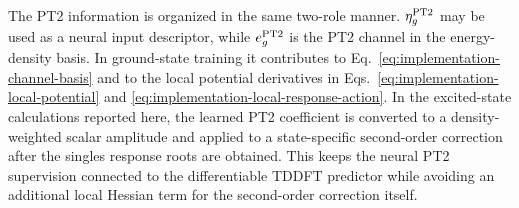 The PT2 information is organized in the same two-role manner.
$\eta^{\rm PT2}_g$ may be used as a neural input descriptor, while
$e^{\rm PT2}_g$ is the PT2 channel in the energy-density basis.  In
ground-state training it contributes to
Eq.~\eqref{eq:implementation-channel-basis} and to the local potential
derivatives in Eqs.~\eqref{eq:implementation-local-potential} and
\eqref{eq:implementation-local-response-action}.  In the excited-state
calculations reported here, the learned PT2 coefficient is converted
to a density-weighted scalar amplitude and applied to a state-specific
second-order correction after the singles response roots are obtained.
This keeps the neural PT2 supervision connected to the differentiable
TDDFT predictor while avoiding an additional local Hessian term for the
second-order correction itself.
